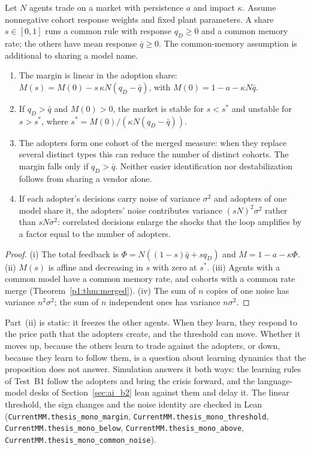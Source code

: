 \begin{proposition}[Monoculture]\label{prop:monoculture}
Let $N$ agents trade on a market with persistence $a$ and impact $\kappa$. Assume nonnegative cohort response weights and fixed plant parameters. A share $s\in[0,1]$ runs a common rule with response $q_D\ge0$ and a common memory rate; the others have mean response $\bar q\ge0$. The common-memory assumption is additional to sharing a model name.
\begin{enumerate}[label=(\roman*)]
\item The margin is linear in the adoption share: $M(s)=M(0)-s\,\kappa N(q_D-\bar q)$, with $M(0)=1-a-\kappa N\bar q$.
\item If $q_D>\bar q$ and $M(0)>0$, the market is stable for $s<s^*$ and unstable for $s>s^*$, where $s^*=M(0)/(\kappa N(q_D-\bar q))$.
\item The adopters form one cohort of the merged measure: when they replace several distinct types this can reduce the number of distinct cohorts. The margin falls only if $q_D>\bar q$. Neither easier identification nor destabilization follows from sharing a vendor alone.
\item If each adopter's decisions carry noise of variance $\sigma^2$ and adopters of one model share it, the adopters' noise contributes variance $(sN)^2\sigma^2$ rather than $sN\sigma^2$: correlated decisions enlarge the shocks that the loop amplifies by a factor equal to the number of adopters.
\end{enumerate}
\hfill\Proved
\end{proposition}

\begin{proof}
(i) The total feedback is $\Phi=N((1-s)\bar q+sq_D)$ and $M=1-a-\kappa\Phi$. (ii) $M(s)$ is affine and decreasing in $s$ with zero at $s^*$. (iii) Agents with a common model have a common memory rate, and cohorts with a common rate merge (Theorem~\ref{p1:thm:merged}). (iv) The sum of $n$ copies of one noise has variance $n^2\sigma^2$; the sum of $n$ independent ones has variance $n\sigma^2$.
\end{proof}

Part~(ii) is static: it freezes the other agents. When they learn, they respond to the price path that the adopters create, and the threshold can move. Whether it moves up, because the others learn to trade against the adopters, or down, because they learn to follow them, is a question about learning dynamics that the proposition does not answer. Simulation answers it both ways: the learning rules of Test~B1 follow the adopters and bring the crisis forward, and the language-model desks of Section~\ref{sec:ai_b2} lean against them and delay it. The linear threshold, the sign changes and the noise identity are checked in Lean (\nolinkurl{CurrentMM.thesis_mono_margin}, \nolinkurl{CurrentMM.thesis_mono_threshold}, \nolinkurl{CurrentMM.thesis_mono_below}, \nolinkurl{CurrentMM.thesis_mono_above}, \nolinkurl{CurrentMM.thesis_mono_common_noise}).

